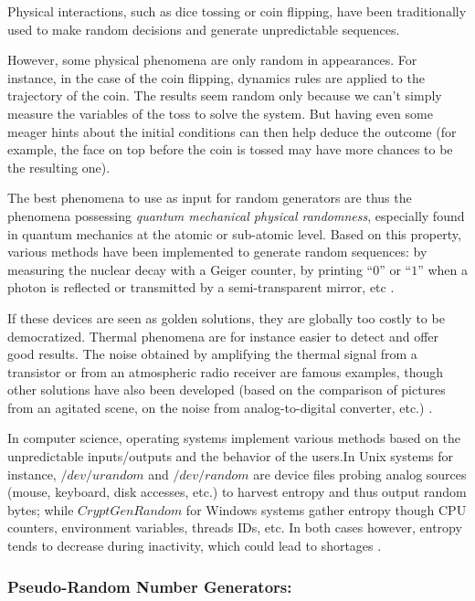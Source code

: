 \documentclass{llncs}
\begin{document}
Physical interactions, such as dice tossing or coin flipping, have been traditionally used to make random decisions and generate unpredictable sequences.

However, some physical phenomena are only random in appearances. For instance, in the case of the coin flipping, dynamics rules are applied to the trajectory of the coin. The results seem random only because we can't simply measure the variables of the toss to solve the system. But having even some meager hints about the initial conditions can then help deduce the outcome (for example, the face on top before the coin is tossed may have more chances to be the resulting one).

The best phenomena to use as input for random generators are thus the phenomena possessing \emph{quantum mechanical physical randomness}, especially found in quantum mechanics at the atomic or sub-atomic level. Based on this property, various methods have been implemented to generate random sequences: by measuring the nuclear decay with a Geiger counter, by printing “$0$” or “$1$” when a photon is reflected or transmitted by a semi-transparent mirror, etc \cite{w-rng,down}.

If these devices are seen as golden solutions, they are globally too costly to be democratized. Thermal phenomena are for instance easier to detect and offer good results. The noise obtained by amplifying the thermal signal from a transistor or from an atmospheric radio receiver are famous examples, though other solutions have also been developed (based on the comparison of pictures from an agitated scene, on the noise from analog-to-digital converter, etc.) \cite{w-rng}.

In computer science, operating systems implement various methods based on the unpredictable inputs/outputs and the behavior of the users.In Unix systems for instance, $/dev/urandom$ and $/dev/random$ are device files probing analog sources (mouse, keyboard, disk accesses, etc.) to harvest entropy and thus output random bytes; while $CryptGenRandom$ for Windows systems gather entropy though CPU counters, environment variables, threads IDs, etc. In both cases however, entropy tends to decrease during inactivity, which could lead to shortages \cite{auma}.

\subsubsection{Pseudo-Random Number Generators:}
\end{document}
